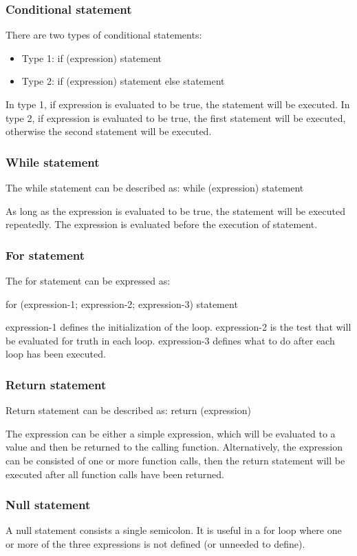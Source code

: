 \documentclass[a4paper,12pt]{article}
\begin{document}
\subsubsection{Conditional statement}
There are two types of conditional statements:

\begin{itemize}
\item Type 1: if (expression) statement
\item Type 2: if (expression) statement else statement
\end{itemize}
In type 1, if expression is evaluated to be true, the statement will be executed. In type 2, if expression is evaluated to be true, the first statement will be executed, otherwise the second statement will be executed.
\subsubsection{While statement}
The while statement can be described as: while (expression) statement

As long as the expression is evaluated to be true, the statement will be executed repeatedly. The expression is evaluated before the execution of statement.

\subsubsection{For statement}
The for statement can be expressed as: 

for (expression-1; expression-2; expression-3) statement

expression-1 defines the initialization of the loop. expression-2 is the test that will be evaluated for truth in each loop. expression-3 defines what to do after each loop has been executed.

\subsubsection{Return statement}
Return statement can be described as: return (expression)

The expression can be either a simple expression, which will be evaluated to a value and then be returned to the calling function. Alternatively, the expression can be consisted of one or more function calls, then the return statement will be executed after all function calls have been returned.

\subsubsection{Null statement}
A null statement consists a single semicolon. It is useful in a for loop where one or more of the three expressions is not defined (or unneeded to define).
\end{document}
